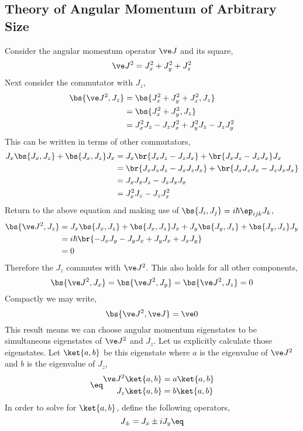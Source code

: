 \documentclass{article}
\begin{document}
\subsection{Theory of Angular Momentum of Arbitrary Size}
Consider the angular momentum operator $\ve J$ and its square,
\[ \ve J^2 = J_x^2 + J_y^2 + J_z^2 \]
Next consider the commutator with $J_z$,
\begin{align*}
\bs{\ve J^2, J_z}
&= \bs{J_x^2 + J_y^2 + J_z^2, J_z} \\
&= \bs{J_x^2 + J_y^2, J_z} \\
&= J_x^2 J_z - J_z J_x^2 + J_y^2 J_z - J_z J_y^2
\end{align*}
This can be written in terms of other commutators,
\begin{align*}
    J_x \bs{J_x, J_z} + \bs{J_x, J_z} J_x
    &=  J_x \br{J_xJ_z - J_zJ_x} + \br{J_xJ_z - J_zJ_x} J_x  \\
    &=  \br{J_xJ_xJ_z - J_xJ_zJ_x} + \br{J_xJ_zJ_x - J_zJ_xJ_x}  \\
    &=  J_xJ_xJ_z - J_zJ_xJ_x  \\
    &=  J_x^2J_z - J_zJ_x^2
\end{align*}
Return to the above equation and making use of $\bs{J_i, J_j} = i\hbar \ep_{ijk} J_k$,
\begin{align*}
\bs{\ve J^2, J_z}
&= J_x\bs{J_x, J_z} + \bs{J_x, J_z}J_x + J_y\bs{J_y, J_z}+ \bs{J_y, J_z}J_y \\
&= i\hbar\br{-J_xJ_y - J_yJ_x + J_yJ_x+ J_xJ_y} \\
&= 0
\end{align*}
Therefore the $J_z$ commutes with $\ve J^2$. This also holds for all other components,
\[ \bs{\ve J^2, J_x} = \bs{\ve J^2, J_y} = \bs{\ve J^2, J_z} = 0 \]
Compactly we may write,
\[ \bs{\ve J^2, \ve J}= \ve 0 \]
This result means we can choose angular momentum eigenstates to be simultaneous eigenstates of $\ve J^2$ and $J_z$. Let us explicitly calculate those eigenstates. Let $\ket{a,b}$ be this eigenstate where $a$ is the eigenvalue of $\ve J^2$ and $b$ is the eigenvalue of $J_z$,
\begin{align*}
    \eq\label{eq:rotation_system}
    \begin{split}
    \ve J^2 \ket{a,b} &= a \ket{a,b} \\
    J_z \ket{a,b} &= b \ket{a,b}
    \end{split}
\end{align*}
In order to solve for $\ket{a,b}$, define the following operators,
\[ J_{\pm} = J_x \pm i J_y \eq \label{eq:defjpjm}\]
\end{document}

